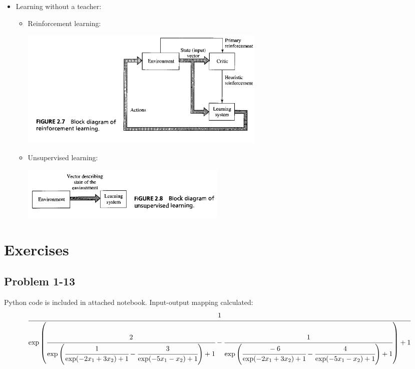 \documentclass[paper=a4, fontsize=11pt]{scrartcl} %
\begin{document}
\begin{itemize}
\begin{itemize}
            \item Learning without a teacher:
            \begin{itemize}
                \item Reinforcement learning:
                \begin{center}
                    \includegraphics[width=12.0cm]{../images/Haykin-NN-figure2-7.png} %
                \end{center}
                \item Unsupervised learning:
                \begin{center}
                    \includegraphics[width=10.0cm]{../images/Haykin-NN-figure2-8.png} %
                \end{center}
            \end{itemize}
        \end{itemize}

    \end{itemize}

    \section*{Exercises}
    \subsection*{Problem 1-13}
    Python code is included in attached notebook. Input-output mapping calculated:
    \tiny
    \[\cfrac{1}{\exp\left(\cfrac{2}{\exp\left(\cfrac{1}{\exp(-2x_1 + 3x_2) + 1} - \cfrac{3}{\exp(-5x_1 - x_2) + 1}\right) + 1} - \cfrac{1}{\exp\left(\cfrac{-6}{\exp(-2x_1 + 3x_2) + 1} - \cfrac{4}{\exp(-5x_1 - x_2) + 1}\right) + 1}\right) + 1}\]
    \normalsize
\end{document}
